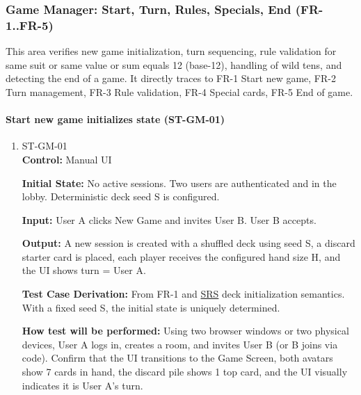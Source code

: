 \documentclass[12pt, titlepage]{article}
\begin{document}
\subsubsection{Game Manager: Start, Turn, Rules, Specials, End (FR-1..FR-5)}

This area verifies new game initialization, turn sequencing, rule validation for same suit or same value or sum equals 12 (base-12), handling of wild tens, and detecting the end of a game. It directly traces to FR-1 Start new game, FR-2 Turn management, FR-3 Rule validation, FR-4 Special cards, FR-5 End of game.

\paragraph{Start new game initializes state (ST-GM-01)}
\begin{enumerate}
\item{ST-GM-01\\}
\textbf{Control:} Manual UI

\textbf{Initial State:} No active sessions. Two users are authenticated and in the lobby. Deterministic deck seed S is configured.

\textbf{Input:} User A clicks New Game and invites User B. User B accepts.

\textbf{Output:} A new session is created with a shuffled deck using seed S, a discard starter card is placed, each player receives the configured hand size H, and the UI shows turn = User A.

\textbf{Test Case Derivation:} From FR-1 and \href{../SRS/SRS.pdf}{SRS} deck initialization semantics. With a fixed seed S, the initial state is uniquely determined.

\textbf{How test will be performed:} Using two browser windows or two physical devices, User A logs in, creates a room, and invites User B (or B joins via code). Confirm that the UI transitions to the Game Screen, both avatars show 7 cards in hand, the discard pile shows 1 top card, and the UI visually indicates it is User A's turn.
\end{enumerate}
\end{document}
